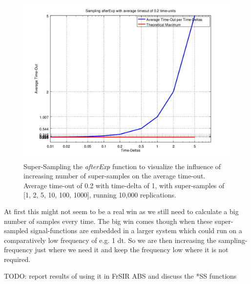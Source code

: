 \begin{figure}
	\centering
	\includegraphics[width=.6\textwidth, angle=0]{./../shared/fig/samplingTest_afterExp_02time.png}
	\caption{Super-Sampling the \textit{afterExp} function to visualize the influence of increasing number of super-samples on the average time-out. Average time-out of 0.2 with time-delta of 1, with super-samples of [1, 2, 5, 10, 100, 1000], running 10,000 replications.}
	\label{fig:sampling_afterExp_ss_02time}
\end{figure}

At first this might not seem to be a real win as we still need to calculate a big number of samples every time. The big win comes though when these super-sampled signal-functions are embedded in a larger system which could run on a comparatively low frequency of e.g. 1 dt. So we are then increasing the sampling-frequency just where we need it and keep the frequency low where it is not required.

TODO: report results of using it in FrSIR ABS and discuss the *SS functions 